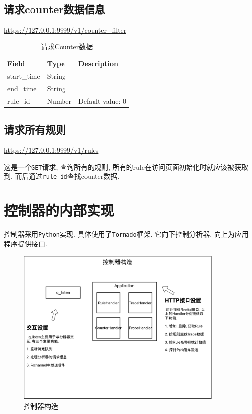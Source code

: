 \subsection{请求counter数据信息}

\url{https://127.0.0.1:9999/v1/counter_filter}

\begin{table}[]
    \centering
    \caption{请求Counter数据}
    \label{tbl:get_counter}
    \begin{tabular}{lll}  \hline
    Field       & Type   & Description      \\ \hline
    start\_time & String &                  \\
    end\_time   & String &                  \\
    rule\_id    & Number & Default value: 0 \\ \hline
    \end{tabular}
\end{table}

\subsection{请求所有规则}

\url{https://127.0.0.1:9999/v1/rules}

这是一个\texttt{GET}请求, 查询所有的规则, 所有的rule在访问页面初始化时就应该被获取到,
而后通过\texttt{rule\_id}查找counter数据.


\section{控制器的内部实现}

控制器采用\texttt{Python}实现. 具体使用了\texttt{Tornado}框架.
它向下控制分析器, 向上为应用程序提供接口.

\begin{figure}[htbp!]
  \centering
  \includegraphics[width=0.9\textwidth]{../img/controler_arch.png}
  \caption{控制器构造}
  \label{fig:contoler_arch}
\end{figure}

